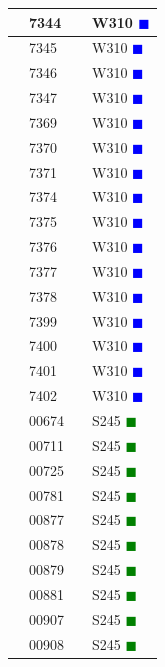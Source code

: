 \documentclass{article}
\begin{document}
\begin{tabularx}{\linewidth}{|X|l|l|X|}
 & 7344 &  & W310 \textcolor{blue}{$\blacksquare$} \\ \hline
 & 7345 &  & W310 \textcolor{blue}{$\blacksquare$} \\ \hline
 & 7346 &  & W310 \textcolor{blue}{$\blacksquare$} \\ \hline
 & 7347 &  & W310 \textcolor{blue}{$\blacksquare$} \\ \hline
 & 7369 &  & W310 \textcolor{blue}{$\blacksquare$} \\ \hline
 & 7370 &  & W310 \textcolor{blue}{$\blacksquare$} \\ \hline
 & 7371 &  & W310 \textcolor{blue}{$\blacksquare$} \\ \hline
 & 7374 &  & W310 \textcolor{blue}{$\blacksquare$} \\ \hline
 & 7375 &  & W310 \textcolor{blue}{$\blacksquare$} \\ \hline
 & 7376 &  & W310 \textcolor{blue}{$\blacksquare$} \\ \hline
 & 7377 &  & W310 \textcolor{blue}{$\blacksquare$} \\ \hline
 & 7378 &  & W310 \textcolor{blue}{$\blacksquare$} \\ \hline
 & 7399 &  & W310 \textcolor{blue}{$\blacksquare$} \\ \hline
 & 7400 &  & W310 \textcolor{blue}{$\blacksquare$} \\ \hline
 & 7401 &  & W310 \textcolor{blue}{$\blacksquare$} \\ \hline
 & 7402 &  & W310 \textcolor{blue}{$\blacksquare$} \\ \hline
 & 00674 &  & S245 \textcolor{green}{$\blacksquare$} \\ \hline
 & 00711 &  & S245 \textcolor{green}{$\blacksquare$} \\ \hline
 & 00725 &  & S245 \textcolor{green}{$\blacksquare$} \\ \hline
 & 00781 &  & S245 \textcolor{green}{$\blacksquare$} \\ \hline
 & 00877 &  & S245 \textcolor{green}{$\blacksquare$} \\ \hline
 & 00878 &  & S245 \textcolor{green}{$\blacksquare$} \\ \hline
 & 00879 &  & S245 \textcolor{green}{$\blacksquare$} \\ \hline
 & 00881 &  & S245 \textcolor{green}{$\blacksquare$} \\ \hline
 & 00907 &  & S245 \textcolor{green}{$\blacksquare$} \\ \hline
 & 00908 &  & S245 \textcolor{green}{$\blacksquare$} \\ \hline

\end{tabularx}
\end{document}
